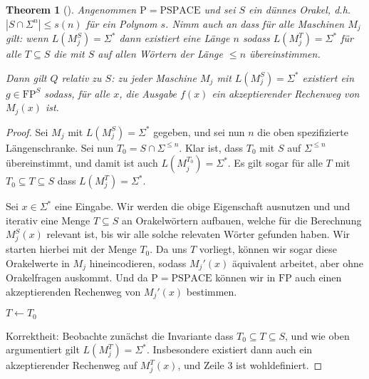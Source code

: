 \documentclass[nofonts]{uebung}
\newtheorem{theorem}{Theorem}
\theoremstyle{definition}
\def\P{\ensuremath{\mathrm{P}}}
\def\FP{\ensuremath{\mathrm{FP}}}
\def\PSPACE{\ensuremath{\mathrm{PSPACE}}}
\begin{document}
\begin{theorem}[\cite{fortnow_separability_2002}]
    Angenommen $\P=\PSPACE$ und sei $S$ ein dünnes Orakel, d.h. $|S\cap\Sigma^n|\leq s(n)$ für ein Polynom $s$.
    Nimm auch an dass für alle Maschinen $M_j$ gilt: wenn $L(M_j^S)=\Sigma^*$ dann existiert eine Länge $n$ sodass $L(M_j^T)=\Sigma^*$ für alle $T\subseteq S$ die mit $S$ auf allen Wörtern der Länge $\leq n$ übereinstimmen.

    Dann gilt $Q$ relativ zu $S$: zu jeder Maschine $M_j$ mit $L(M_j^S)=\Sigma^*$ existiert ein $g\in\FP^S$ sodass, für alle $x$, die Ausgabe $f(x)$ ein akzeptierender Rechenweg von $M_j(x)$ ist. 
\end{theorem}
\begin{proof}
    Sei $M_j$ mit $L(M_j^S)=\Sigma^*$ gegeben, und sei nun $n$ die oben spezifizierte Längenschranke.
    Sei nun $T_0=S\cap\Sigma^{\leq n}$. 
    Klar ist, dass $T_0$ mit $S$ auf $\Sigma^{\leq n}$ übereinstimmt, und damit ist auch $L(M_j^{T_0})=\Sigma^*$.
    Es gilt sogar für alle $T$ mit $T_0\subseteq T \subseteq S$ dass $L(M_j^{T})=\Sigma^*$.

    Sei $x\in\Sigma^*$ eine Eingabe.
    Wir werden die obige Eigenschaft ausnutzen und und iterativ eine Menge $T\subseteq S$ an Orakelwörtern aufbauen, welche für die Berechnung $M_j^S(x)$ relevant ist, bis wir alle solche relevaten Wörter gefunden haben. Wir starten hierbei mit der Menge $T_0$.
    Da uns $T$ vorliegt, können wir sogar diese Orakelwerte in $M_j$ hineincodieren, sodass $M_j'(x)$ äquivalent arbeitet, aber ohne Orakelfragen auskommt. Und da $\P=\PSPACE$ können wir in $\FP$ auch einen akzeptierenden Rechenweg von $M_j'(x)$ bestimmen.

    \noindent
    \begin{algorithm}[H]
        $T\gets T_0$\;
    \end{algorithm}

    Korrektheit: Beobachte zunächst die Invariante dass $T_0\subseteq T\subseteq S$, und wie oben argumentiert gilt $L(M_j^T)=\Sigma^*$.
    Insbesondere existiert dann auch ein akzeptierender Rechenweg auf $M_j^{T}(x)$, und Zeile 3 ist wohldefiniert.


\end{proof}
\end{document}
